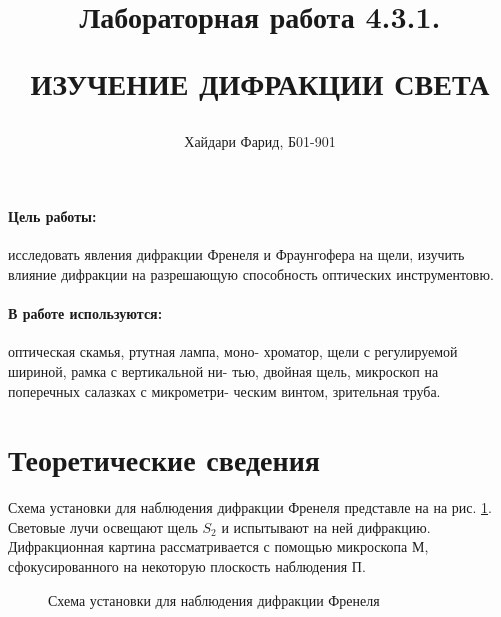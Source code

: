\documentclass[a5paper,10pt, twoside]{article} %
\title
{
	\hfill \break	\hfill \break
	\hfill \break	\hfill \break
	Лабораторная работа 4.3.1.
	
	ИЗУЧЕНИЕ ДИФРАКЦИИ СВЕТА
}
\author{Хайдари Фарид, Б01-901}
\begin{document}
	
\maketitle


\thispagestyle{empty} %

\newpage

\tableofcontents %

\newpage


\paragraph{Цель работы:}

	исследовать явления дифракции Френеля и Фраунгофера на щели, изучить влияние дифракции на 
	разрешающую способность оптических инструментовю.

\paragraph{В работе используются:}

	оптическая скамья, ртутная лампа, моно-
	хроматор, щели с регулируемой шириной, рамка с вертикальной ни-
	тью, двойная щель, микроскоп на поперечных салазках с микрометри-
	ческим винтом, зрительная труба.

\section{Теоретические сведения}

	Схема установки для наблюдения дифракции Френеля представле на на рис. \ref{img: scheme0}.
	Световые лучи освещают щель $S_2$ и испытывают на ней дифракцию. Дифракционная картина
	рассматривается с помощью микроскопа $М$, сфокусированного на некоторую плоскость наблюдения $П$.

	\begin{figure}[h]
		\caption{Схема установки для наблюдения дифракции Френеля}
		\label{img: scheme0}
	\end{figure}
\end{document}
